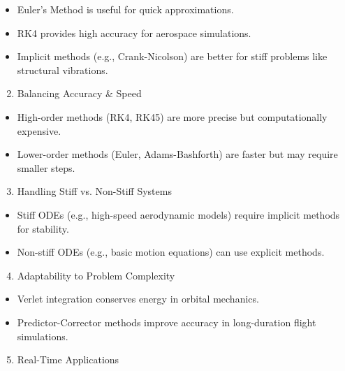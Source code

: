 \documentclass[10pt]{article}
\begin{document}
\begin{itemize}
  \item Euler's Method is useful for quick approximations.
  \item RK4 provides high accuracy for aerospace simulations.
  \item Implicit methods (e.g., Crank-Nicolson) are better for stiff problems like structural vibrations.
\end{itemize}

\begin{enumerate}
  \setcounter{enumi}{1}
  \item Balancing Accuracy \& Speed
\end{enumerate}

\begin{itemize}
  \item High-order methods (RK4, RK45) are more precise but computationally expensive.
  \item Lower-order methods (Euler, Adams-Bashforth) are faster but may require smaller steps.
\end{itemize}

\begin{enumerate}
  \setcounter{enumi}{2}
  \item Handling Stiff vs. Non-Stiff Systems
\end{enumerate}

\begin{itemize}
  \item Stiff ODEs (e.g., high-speed aerodynamic models) require implicit methods for stability.
  \item Non-stiff ODEs (e.g., basic motion equations) can use explicit methods.
\end{itemize}

\begin{enumerate}
  \setcounter{enumi}{3}
  \item Adaptability to Problem Complexity
\end{enumerate}

\begin{itemize}
  \item Verlet integration conserves energy in orbital mechanics.
  \item Predictor-Corrector methods improve accuracy in long-duration flight simulations.
\end{itemize}

\begin{enumerate}
  \setcounter{enumi}{4}
  \item Real-Time Applications
\end{enumerate}
\end{document}
